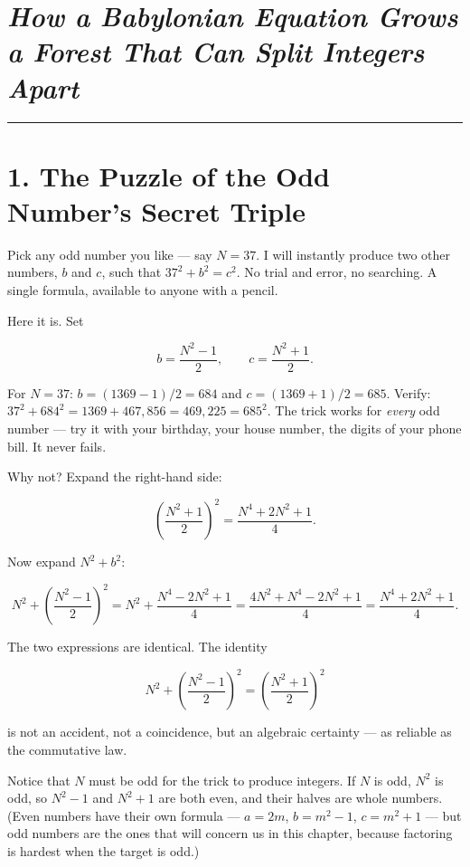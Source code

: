 \documentclass[11pt,openany]{book}
\theoremstyle{definition}
\theoremstyle{plain}
\theoremstyle{remark}
\begin{document}
\section*{\textit{How a Babylonian Equation Grows a Forest That Can Split Integers Apart}}


\bigskip\noindent\rule{\textwidth}{0.4pt}\bigskip


\section{1. The Puzzle of the Odd Number's Secret Triple}


Pick any odd number you like — say $N = 37$. I will instantly produce two other numbers, $b$ and $c$, such that $37^2 + b^2 = c^2$. No trial and error, no searching. A single formula, available to anyone with a pencil.

Here it is. Set

$$b = \frac{N^2 - 1}{2}, \qquad c = \frac{N^2 + 1}{2}.$$

For $N = 37$: $b = (1369 - 1)/2 = 684$ and $c = (1369 + 1)/2 = 685$. Verify: $37^2 + 684^2 = 1369 + 467{,}856 = 469{,}225 = 685^2$. The trick works for \textit{every} odd number — try it with your birthday, your house number, the digits of your phone bill. It never fails.

Why not? Expand the right-hand side:

$$\left(\frac{N^2 + 1}{2}\right)^{\!2} = \frac{N^4 + 2N^2 + 1}{4}.$$

Now expand $N^2 + b^2$:

$$N^2 + \left(\frac{N^2 - 1}{2}\right)^{\!2} = N^2 + \frac{N^4 - 2N^2 + 1}{4} = \frac{4N^2 + N^4 - 2N^2 + 1}{4} = \frac{N^4 + 2N^2 + 1}{4}.$$

The two expressions are identical. The identity

$$N^2 + \left(\frac{N^2 - 1}{2}\right)^{\!2} = \left(\frac{N^2 + 1}{2}\right)^{\!2}$$

is not an accident, not a coincidence, but an algebraic certainty — as reliable as the commutative law.

Notice that $N$ must be odd for the trick to produce integers. If $N$ is odd, $N^2$ is odd, so $N^2 - 1$ and $N^2 + 1$ are both even, and their halves are whole numbers. (Even numbers have their own formula — $a = 2m$, $b = m^2 - 1$, $c = m^2 + 1$ — but odd numbers are the ones that will concern us in this chapter, because factoring is hardest when the target is odd.)
\end{document}
